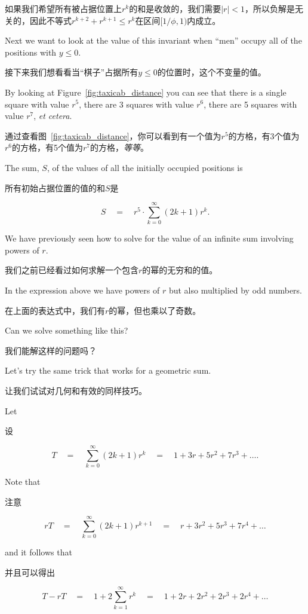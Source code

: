 如果我们希望所有被占据位置上$r^k$的和是收敛的，我们需要$|r|<1$，所以负解是无关的，因此不等式$r^{k+2} + r^{k+1} \leq r^k$在区间$[1/\phi, 1)$内成立。

Next we want to look at the value of this invariant when ``men'' occupy all of
the positions with $y\leq0$.

接下来我们想看看当“棋子”占据所有$y\leq0$的位置时，这个不变量的值。

By looking at Figure~\ref{fig:taxicab_distance}
you can see that there is a single square with value $r^5$,  there are 3 squares
with value $r^6$, there are 5 squares with value $r^7$, \emph{et cetera}.

通过查看图~\ref{fig:taxicab_distance}，你可以看到有一个值为$r^5$的方格，有3个值为$r^6$的方格，有5个值为$r^7$的方格，\emph{等等}。

The sum, $S$, of the values of all the initially occupied positions is

所有初始占据位置的值的和$S$是

\[ S \quad = \quad r^5 \cdot \sum_{k=0}^{\infty} (2k+1) r^k. \]

We have previously seen how to solve for the value of an infinite sum involving
powers of $r$.

我们之前已经看过如何求解一个包含$r$的幂的无穷和的值。

In the expression above we have powers of $r$ but also 
multiplied by odd numbers.

在上面的表达式中，我们有$r$的幂，但也乘以了奇数。

Can we solve something like this?

我们能解这样的问题吗？

Let's try the same trick that works for a geometric sum.

让我们试试对几何和有效的同样技巧。

Let

设

\[ T \quad = \quad  \sum_{k=0}^{\infty} (2k+1) r^k \quad = \quad  1 + 3r + 5r^2 + 7r^3 + \ldots. \]

Note that 

注意

\[ rT \quad = \quad  \sum_{k=0}^{\infty} (2k+1) r^{k+1} \quad = \quad  r + 3r^2 + 5r^3 + 7r^4 + \ldots \]

\noindent and it follows that 

\noindent 并且可以得出

\[ T - rT \quad = \quad  1 + 2 \sum_{k=1}^{\infty} r^{k} \quad = \quad 1 + 2r + 2r^2 + 2r^3 + 2r^4 + \ldots \]

